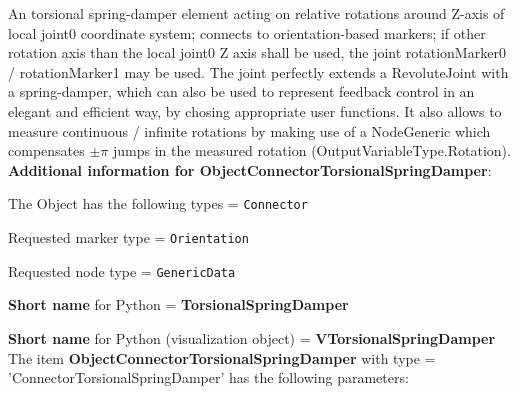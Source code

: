 \label{sec:item:ObjectConnectorTorsionalSpringDamper}
An torsional spring-damper element acting on relative rotations around Z-axis of local joint0 coordinate system; connects to orientation-based markers; if other rotation axis than the local joint0 Z axis shall be used, the joint rotationMarker0 / rotationMarker1 may be used. The joint perfectly extends a RevoluteJoint with a spring-damper, which can also be used to represent feedback control in an elegant and efficient way, by chosing appropriate user functions. It also allows to measure continuous / infinite rotations by making use of a NodeGeneric which compensates $\pm \pi$ jumps in the measured rotation (OutputVariableType.Rotation).\vspace{12pt}
 \\{\bf Additional information for ObjectConnectorTorsionalSpringDamper}:
\bi
  \item The Object has the following types = \texttt{Connector}
  \item Requested marker type = \texttt{Orientation}
  \item Requested node type = \texttt{GenericData}
  \item {\bf Short name} for Python = {\bf TorsionalSpringDamper}  \item {\bf Short name} for Python (visualization object) = {\bf VTorsionalSpringDamper}\ei
\vspace{12pt} \noindent The item {\bf ObjectConnectorTorsionalSpringDamper} with type = 'ConnectorTorsionalSpringDamper' has the following parameters:\vspace{-1cm}\\ 
